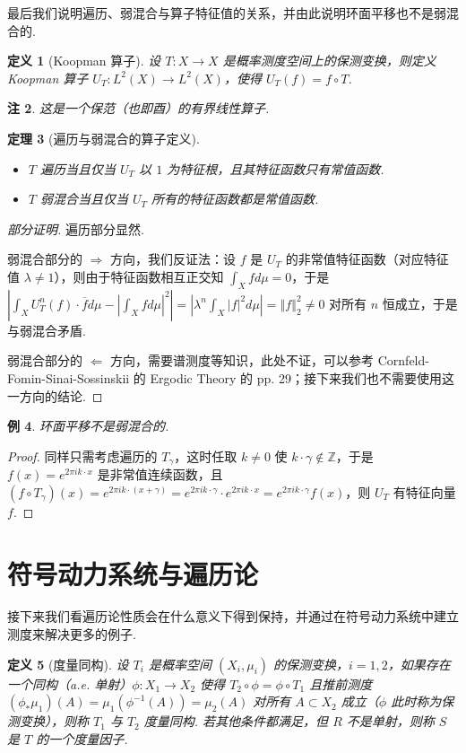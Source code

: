 \documentclass[11pt, a4paper, oneside]{ctexart}
\newtheorem{theorem}{定理}[section]
\newtheorem{definition}[theorem]{定义}
\newtheorem{example}[theorem]{例}
\newtheorem{remark}[theorem]{注}
\newcommand{\Z}{\mathbb{Z}}
\newcommand{\abs}[1]{\left|{#1}\right|}
\newcommand{\norm}[1]{\left\Vert{#1}\right\Vert}
\begin{document}
    最后我们说明遍历、弱混合与算子特征值的关系，并由此说明环面平移也不是弱混合的.

    \begin{definition}[Koopman 算子]
        设 $T:X\to X$ 是概率测度空间上的保测变换，则定义 Koopman 算子 $U_T:L^2(X)\to L^2(X)$，使得 $U_T(f)=f\circ T$.
    \end{definition}
    \begin{remark}
        这是一个保范（也即酉）的有界线性算子.
    \end{remark}
    \begin{theorem}[遍历与弱混合的算子定义]
        \begin{itemize}
            \item $T$ 遍历当且仅当 $U_T$ 以 $1$ 为特征根，且其特征函数只有常值函数.
            \item $T$ 弱混合当且仅当 $U_T$ 所有的特征函数都是常值函数.
        \end{itemize}
    \end{theorem}
    \begin{proof}[部分证明]
        遍历部分显然.

        弱混合部分的 $\Rightarrow$ 方向，我们反证法：设 $f$ 是 $U_T$ 的非常值特征函数（对应特征值 $\lambda\neq 1$），则由于特征函数相互正交知 $\int_{X}fd\mu=0$，于是 $\abs{\int_{X}U_T^n(f)\cdot \overline{f} d\mu-\abs{\int_{X}f d\mu}^2}=\abs{\lambda^n\int_{X}\abs{f}^2 d\mu}=\norm{f}_2^2\neq 0$ 对所有 $n$ 恒成立，于是与弱混合矛盾.

        弱混合部分的 $\Leftarrow$ 方向，需要谱测度等知识，此处不证，可以参考 Cornfeld-Fomin-Sinai-Sossinskii 的 Ergodic Theory 的 pp. 29；接下来我们也不需要使用这一方向的结论.
    \end{proof}

    \begin{example}
        环面平移不是弱混合的.
    \end{example}
    \begin{proof}
        同样只需考虑遍历的 $T_{\gamma}$，这时任取 $k\neq 0$ 使 $k\cdot \gamma\notin \Z$，于是 $f(x)=e^{2\pi i k\cdot x}$ 是非常值连续函数，且 $(f\circ T_{\gamma})(x)=e^{2\pi i k\cdot (x+\gamma)}=e^{2\pi i k\cdot \gamma}\cdot e^{2\pi i k\cdot x}=e^{2\pi i k\cdot \gamma}f(x)$，则 $U_T$ 有特征向量 $f$.
    \end{proof}

    \section{符号动力系统与遍历论}
    接下来我们看遍历论性质会在什么意义下得到保持，并通过在符号动力系统中建立测度来解决更多的例子.
    \begin{definition}[度量同构]
        设 $T_i$ 是概率空间 $(X_i, \mu_i)$ 的保测变换，$i=1,2$，如果存在一个同构（a.e. 单射）$\phi:X_1\to X_2$ 使得 $T_2\circ \phi=\phi\circ T_1$ 且推前测度 $(\phi_*\mu_1)(A)=\mu_1(\phi^{-1}(A))=\mu_2(A)$ 对所有 $A\subset X_2$ 成立（$\phi$ 此时称为保测变换），则称 $T_1$ 与 $T_2$ 度量同构. 若其他条件都满足，但 $R$ 不是单射，则称 $S$ 是 $T$ 的一个度量因子.
    \end{definition}
    
\end{document}
